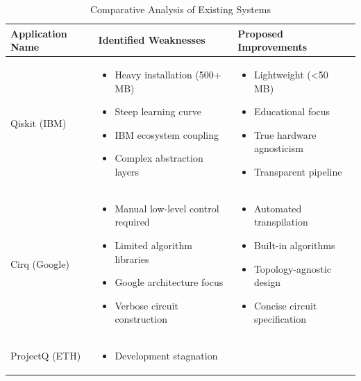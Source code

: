 \vspace{0.5cm}

\begin{table}[h!]
\centering
\caption{Comparative Analysis of Existing Systems}
\renewcommand{\arraystretch}{1.3}

\begin{tabularx}{\textwidth}{|p{3cm}|X|X|}
\hline
\textbf{Application Name} & \textbf{Identified Weaknesses} & \textbf{Proposed Improvements} \\
\hline
Qiskit (IBM) &
\begin{itemize}[leftmargin=*, noitemsep, topsep=0pt]
    \item Heavy installation (500+ MB)
    \item Steep learning curve
    \item IBM ecosystem coupling
    \item Complex abstraction layers
\end{itemize}
&
\begin{itemize}[leftmargin=*, noitemsep, topsep=0pt]
    \item Lightweight (<50 MB)
    \item Educational focus
    \item True hardware agnosticism
    \item Transparent pipeline
\end{itemize}
\\
\hline
Cirq (Google) &
\begin{itemize}[leftmargin=*, noitemsep, topsep=0pt]
    \item Manual low-level control required
    \item Limited algorithm libraries
    \item Google architecture focus
    \item Verbose circuit construction
\end{itemize}
&
\begin{itemize}[leftmargin=*, noitemsep, topsep=0pt]
    \item Automated transpilation
    \item Built-in algorithms
    \item Topology-agnostic design
    \item Concise circuit specification
\end{itemize}
\\
\hline
ProjectQ (ETH) &
\begin{itemize}[leftmargin=*, noitemsep, topsep=0pt]
    \item Development stagnation

\end{itemize}
\end{tabularx}
\end{table}

